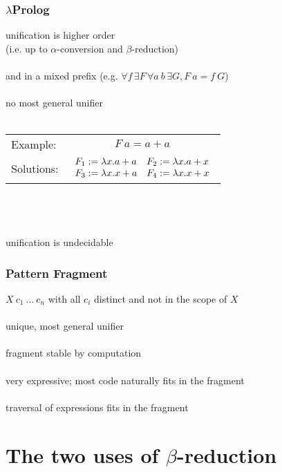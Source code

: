 \documentclass{beamer}
\begin{document}
\begin{frame}
 \frametitle{$\lambda$Prolog}
 unification is \alert{higher order}\\(i.e. up to $\alpha$-conversion and $\beta$-reduction)\\~\\

 and in a \alert{mixed prefix}
 (e.g. $\forall f\, \exists F\, \forall a~b\, \exists G, F~a = f~G$)\\~\\

 \alert{no most general unifier}\\~\\

 \begin{tabular}{lc}
 Example: & $F~a = a + a$\\
 Solutions: &
 $\begin{array}{l@{~~~}l}F_1 := \lambda x. a+a & F_2 := \lambda x. a+x\\ F_3 := \lambda x. x+a & F_4 := \lambda x.x+x\end{array}$
 \end{tabular}
\\~\\~\\
 
 unification is \alert{undecidable}
\end{frame}

\begin{frame}
 \frametitle{Pattern Fragment}
 $X~c_1~\ldots~c_n$ with all $c_i$ distinct and not in the scope of $X$\\~\\

 \alert{unique, most general unifier}\\~\\

 fragment \alert{stable} by computation\\~\\

 very expressive; most code naturally fits in the fragment\\~\\

 \alert{traversal of expressions fits in the fragment}
\end{frame}

\section{The two uses of $\beta$-reduction}
\end{document}
